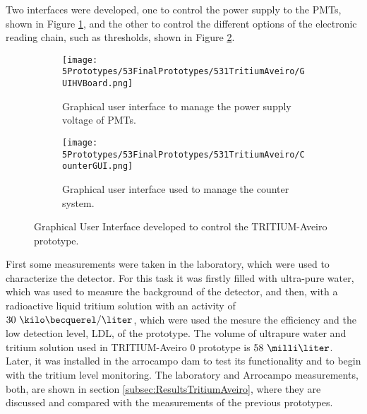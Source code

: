 Two interfaces were developed, one to control the power supply to the PMTs, shown in Figure \ref{subfig:GUIHV}, and the other to control the different options of the electronic reading chain, such as thresholds, shown in Figure \ref{subfig:GUIcounts}.

\begin{figure}
\centering
    \begin{subfigure}[b]{0.65\textwidth}
    \centering
    \texttt{[image: 5Prototypes/53FinalPrototypes/531TritiumAveiro/GUIHVBoard.png]}  
    \caption{Graphical user interface to manage the power supply voltage of PMTs.\label{subfig:GUIHV}}
    \end{subfigure}
    \hfill
    \begin{subfigure}[b]{0.8\textwidth}
    \centering
    \texttt{[image: 5Prototypes/53FinalPrototypes/531TritiumAveiro/CounterGUI.png]}  
    \caption{Graphical user interface used to manage the counter system.\label{subfig:GUIcounts}}
    \end{subfigure}
 \caption{Graphical User Interface developed to control the TRITIUM-Aveiro prototype.}
 \label{fig:GUITRITIUMAveiro}
\end{figure}

First some measurements were taken in the laboratory, which were used to characterize the detector. For this task it was firstly filled with ultra-pure water, which was used to measure the background of the detector, and then, with a radioactive liquid tritium solution with an activity of $30~\kilo\becquerel/\liter$, which were used the mesure the efficiency and the low detection level, LDL, of the prototype. The volume of ultrapure water and tritium solution used in TRITIUM-Aveiro 0 prototype is $58~\milli\liter$. Later, it was installed in the arrocampo dam to test its functionality and to begin with the tritium level monitoring. The laboratory and Arrocampo measurements, both, are shown in section \ref{subsec:ResultsTritiumAveiro}, where they are discussed and compared with the measurements of the previous prototypes.